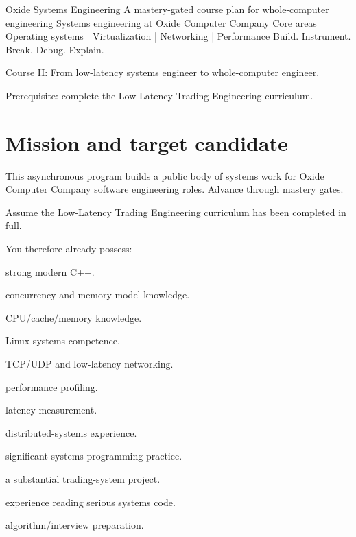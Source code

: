 \documentclass[11pt,letterpaper]{article}
\begin{document}
\coursecover
  {Oxide Systems Engineering}
  {A mastery-gated course plan for whole-computer engineering}
  {Systems engineering at Oxide Computer Company}
  {Core areas}
  {Operating systems | Virtualization | Networking | Performance}
  {Build. Instrument. Break. Debug. Explain.}
  {Course II: From low-latency systems engineer to whole-computer engineer.\par Prerequisite: complete the Low-Latency Trading Engineering curriculum.}

\tableofcontents
\clearpage


\section{Mission and target candidate}\label{sec:1}

This asynchronous program builds a public body of systems work for Oxide Computer Company software engineering roles. Advance through mastery gates.

Assume the Low-Latency Trading Engineering curriculum has been completed in full.

You therefore already possess:

\begin{topics}

\item strong modern C++.

\item concurrency and memory-model knowledge.

\item CPU/cache/memory knowledge.

\item Linux systems competence.

\item TCP/UDP and low-latency networking.

\item performance profiling.

\item latency measurement.

\item distributed-systems experience.

\item significant systems programming practice.

\item a substantial trading-system project.

\item experience reading serious systems code.

\item algorithm/interview preparation.

\end{topics}
\end{document}

